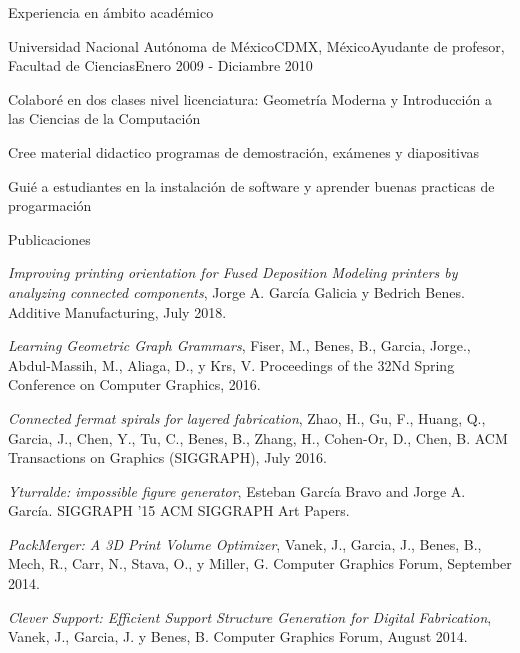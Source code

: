 \documentclass{resume} %
\begin{document}
\begin{rSection}{Experiencia en ámbito académico}
	\begin{rSubsection}{Universidad Nacional Autónoma de México}{CDMX, México}{Ayudante de profesor, Facultad de Ciencias}{Enero 2009 - Diciambre 2010}
	\item Colaboré en dos clases nivel licenciatura: Geometría Moderna y Introducción a las Ciencias de la Computación
	\item Cree material didactico programas de demostración, exámenes y diapositivas
	\item Guié a estudiantes en la instalación de software y aprender buenas practicas de progarmación
	\end{rSubsection}

\end{rSection}

\begin{rSection}{Publicaciones} \itemsep -4pt
\item \textit{Improving printing orientation for Fused Deposition Modeling printers by analyzing connected components}, Jorge A. García Galicia y Bedrich Benes. Additive Manufacturing, July 2018.
\item \textit{Learning Geometric Graph Grammars}, Fiser, M., Benes, B., Garcia, Jorge., Abdul-Massih, M., Aliaga, D., y Krs, V. Proceedings of the 32Nd Spring Conference on Computer Graphics, 2016.
\item \textit{Connected fermat spirals for layered fabrication}, Zhao, H., Gu, F., Huang, Q., Garcia, J., Chen, Y., Tu, C., Benes, B., Zhang, H., Cohen-Or, D., Chen, B. ACM Transactions on Graphics (SIGGRAPH), July 2016.
\item \textit{Yturralde: impossible figure generator}, Esteban García Bravo and Jorge A. García. SIGGRAPH '15 ACM SIGGRAPH Art Papers.
\item \textit{PackMerger: A 3D Print Volume Optimizer}, Vanek, J., Garcia, J., Benes, B., Mech, R., Carr, N., Stava, O., y Miller, G. Computer Graphics Forum, September 2014.
\item \textit{Clever Support: Efficient Support Structure Generation for Digital Fabrication}, Vanek, J., Garcia, J. y Benes, B. Computer Graphics Forum, August 2014.
\end{rSection}

\end{document}
